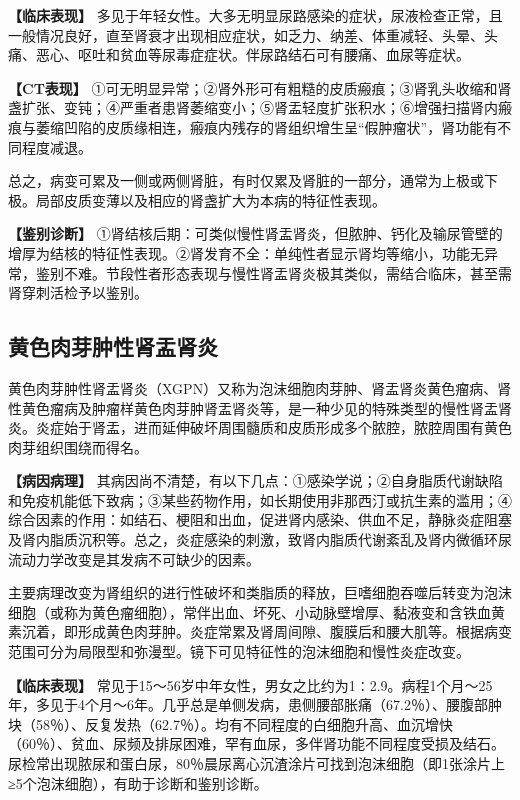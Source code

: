 \textbf{【临床表现】}
多见于年轻女性。大多无明显尿路感染的症状，尿液检查正常，且一般情况良好，直至肾衰才出现相应症状，如乏力、纳差、体重减轻、头晕、头痛、恶心、呕吐和贫血等尿毒症症状。伴尿路结石可有腰痛、血尿等症状。

\textbf{【CT表现】}
①可无明显异常；②肾外形可有粗糙的皮质瘢痕；③肾乳头收缩和肾盏扩张、变钝；④严重者患肾萎缩变小；⑤肾盂轻度扩张积水；⑥增强扫描肾内瘢痕与萎缩凹陷的皮质缘相连，瘢痕内残存的肾组织增生呈“假肿瘤状”，肾功能有不同程度减退。

总之，病变可累及一侧或两侧肾脏，有时仅累及肾脏的一部分，通常为上极或下极。局部皮质变薄以及相应的肾盏扩大为本病的特征性表现。

\textbf{【鉴别诊断】}
①肾结核后期：可类似慢性肾盂肾炎，但脓肿、钙化及输尿管壁的增厚为结核的特征性表现。②肾发育不全：单纯性者显示肾均等缩小，功能无异常，鉴别不难。节段性者形态表现与慢性肾盂肾炎极其类似，需结合临床，甚至需肾穿刺活检予以鉴别。

\subsection{黄色肉芽肿性肾盂肾炎}

黄色肉芽肿性肾盂肾炎（XGPN）又称为泡沫细胞肉芽肿、肾盂肾炎黄色瘤病、肾性黄色瘤病及肿瘤样黄色肉芽肿肾盂肾炎等，是一种少见的特殊类型的慢性肾盂肾炎。炎症始于肾盂，进而延伸破坏周围髓质和皮质形成多个脓腔，脓腔周围有黄色肉芽组织围绕而得名。

\textbf{【病因病理】}
其病因尚不清楚，有以下几点：①感染学说；②自身脂质代谢缺陷和免疫机能低下致病；③某些药物作用，如长期使用非那西汀或抗生素的滥用；④综合因素的作用：如结石、梗阻和出血，促进肾内感染、供血不足，静脉炎症阻塞及肾内脂质沉积等。总之，炎症感染的刺激，致肾内脂质代谢紊乱及肾内微循环尿流动力学改变是其发病不可缺少的因素。

主要病理改变为肾组织的进行性破坏和类脂质的释放，巨嗜细胞吞噬后转变为泡沫细胞（或称为黄色瘤细胞），常伴出血、坏死、小动脉壁增厚、黏液变和含铁血黄素沉着，即形成黄色肉芽肿。炎症常累及肾周间隙、腹膜后和腰大肌等。根据病变范围可分为局限型和弥漫型。镜下可见特征性的泡沫细胞和慢性炎症改变。

\textbf{【临床表现】}
常见于15～56岁中年女性，男女之比约为1∶2.9。病程1个月～25年，多见于4个月～6年。几乎总是单侧发病，患侧腰部胀痛（67.2％）、腰腹部肿块（58％）、反复发热（62.7％）。均有不同程度的白细胞升高、血沉增快（60％）、贫血、尿频及排尿困难，罕有血尿，多伴肾功能不同程度受损及结石。尿检常出现脓尿和蛋白尿，80％晨尿离心沉渣涂片可找到泡沫细胞（即1张涂片上≥5个泡沫细胞），有助于诊断和鉴别诊断。

